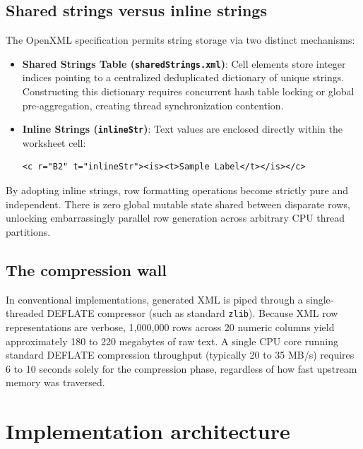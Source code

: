 \subsection{Shared strings versus inline strings}\label{shared-strings-versus-inline-strings}

The OpenXML specification permits string storage via two distinct mechanisms:

\begin{itemize}
\item
  \textbf{Shared Strings Table (\texttt{sharedStrings.xml})}: Cell elements store integer indices pointing to a centralized deduplicated dictionary of unique strings. Constructing this dictionary requires concurrent hash table locking or global pre-aggregation, creating thread synchronization contention.
\item
  \textbf{Inline Strings (\texttt{inlineStr})}: Text values are enclosed directly within the worksheet cell:

\begin{verbatim}
<c r="B2" t="inlineStr"><is><t>Sample Label</t></is></c>
\end{verbatim}
\end{itemize}

By adopting inline strings, row formatting operations become strictly pure and independent. There is zero global mutable state shared between disparate rows, unlocking embarrassingly parallel row generation across arbitrary CPU thread partitions.

\subsection{The compression wall}\label{the-compression-wall}

In conventional implementations, generated XML is piped through a single-threaded DEFLATE compressor (such as standard \texttt{zlib}). Because XML row representations are verbose, 1,000,000 rows across 20 numeric columns yield approximately 180 to 220 megabytes of raw text. A single CPU core running standard DEFLATE compression throughput (typically 20 to 35 MB/s) requires 6 to 10 seconds solely for the compression phase, regardless of how fast upstream memory was traversed.

\section{Implementation architecture}\label{implementation-architecture}

